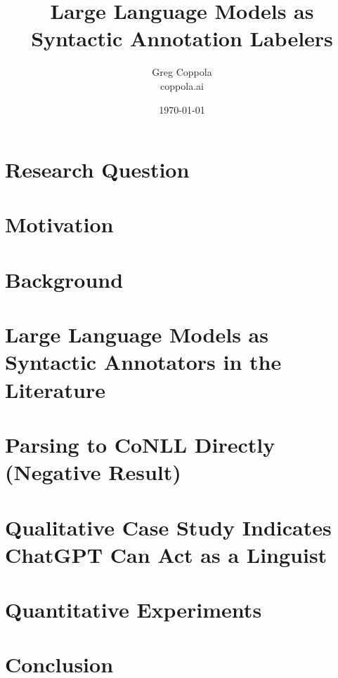 \documentclass[11pt]{article}
\title{Large Language Models as Syntactic Annotation Labelers}
\author{Greg Coppola\\coppola.ai}
\date{\today}
\begin{document}
\maketitle



\section{Research Question}


\section{Motivation}


\section{Background}


\section{Large Language Models as Syntactic Annotators in the Literature}


\section{Parsing to CoNLL Directly (Negative Result)}


\section{Qualitative Case Study Indicates ChatGPT Can Act as a Linguist}


\section{Quantitative Experiments}


\section{Conclusion}




\end{document}
